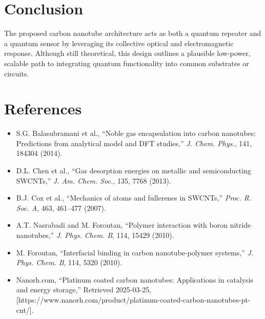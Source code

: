 \documentclass[11pt]{article}
\begin{document}
	\section{Conclusion}
	The proposed carbon nanotube architecture acts as both a quantum repeater and a quantum sensor by leveraging its collective optical and electromagnetic response. Although still theoretical, this design outlines a plausible low-power, scalable path to integrating quantum functionality into common substrates or circuits.
	
	\section{References}
	\begin{itemize}
		\item S.G. Balasubramani et al., ``Noble gas encapsulation into carbon nanotubes: Predictions from analytical model and DFT studies,'' \textit{J. Chem. Phys.}, 141, 184304 (2014).
		\item D.L. Chen et al., ``Gas desorption energies on metallic and semiconducting SWCNTs,'' \textit{J. Am. Chem. Soc.}, 135, 7768 (2013).
		\item B.J. Cox et al., ``Mechanics of atoms and fullerenes in SWCNTs,'' \textit{Proc. R. Soc. A}, 463, 461–477 (2007).
		\item A.T. Nasrabadi and M. Foroutan, ``Polymer interaction with boron nitride nanotubes,'' \textit{J. Phys. Chem. B}, 114, 15429 (2010).
		\item M. Foroutan, ``Interfacial binding in carbon nanotube-polymer systems,'' \textit{J. Phys. Chem. B}, 114, 5320 (2010).
		\item Nanorh.com, ``Platinum coated carbon nanotubes: Applications in catalysis and energy storage,'' Retrieved 2025-03-25, [https://www.nanorh.com/product/platinum-coated-carbon-nanotubes-pt-cnt/].
	\end{itemize}
	
\end{document}
